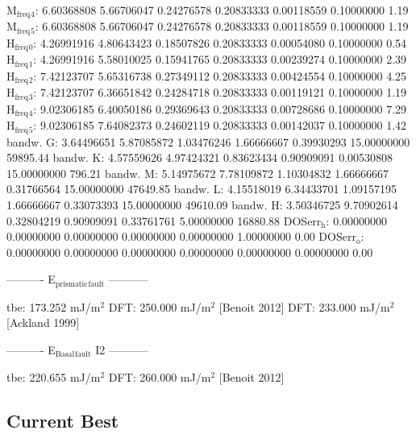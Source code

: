 \documentclass[11pt]{article}
\begin{document}
M\(_{\text{freq}}\)\(_{\text{4}}\):   6.60368808   5.66706047   0.24276578   0.20833333   0.00118559   0.10000000         1.19
M\(_{\text{freq}}\)\(_{\text{5}}\):   6.60368808   5.66706047   0.24276578   0.20833333   0.00118559   0.10000000         1.19
H\(_{\text{freq}}\)\(_{\text{0}}\):   4.26991916   4.80643423   0.18507826   0.20833333   0.00054080   0.10000000         0.54
H\(_{\text{freq}}\)\(_{\text{1}}\):   4.26991916   5.58010025   0.15941765   0.20833333   0.00239274   0.10000000         2.39
H\(_{\text{freq}}\)\(_{\text{2}}\):   7.42123707   5.65316738   0.27349112   0.20833333   0.00424554   0.10000000         4.25
H\(_{\text{freq}}\)\(_{\text{3}}\):   7.42123707   6.36651842   0.24284718   0.20833333   0.00119121   0.10000000         1.19
H\(_{\text{freq}}\)\(_{\text{4}}\):   9.02306185   6.40050186   0.29369643   0.20833333   0.00728686   0.10000000         7.29
H\(_{\text{freq}}\)\(_{\text{5}}\):   9.02306185   7.64082373   0.24602119   0.20833333   0.00142037   0.10000000         1.42
bandw. G:   3.64496651   5.87085872   1.03476246   1.66666667   0.39930293  15.00000000     59895.44
bandw. K:   4.57559626   4.97424321   0.83623434   0.90909091   0.00530808  15.00000000       796.21
bandw. M:   5.14975672   7.78109872   1.10304832   1.66666667   0.31766564  15.00000000     47649.85
bandw. L:   4.15518019   6.34433701   1.09157195   1.66666667   0.33073393  15.00000000     49610.09
bandw. H:   3.50346725   9.70902614   0.32804219   0.90909091   0.33761761   5.00000000     16880.88
DOSerr\(_{\text{h}}\):   0.00000000   0.00000000   0.00000000   0.00000000   0.00000000   1.00000000         0.00
DOSerr\(_{\text{o}}\):   0.00000000   0.00000000   0.00000000   0.00000000   0.00000000   0.00000000         0.00



----------     E\(_{\text{prismatic}}\)\(_{\text{fault}}\)     -----------

tbe:       173.252 mJ/m\(^{\text{2}}\)
DFT:       250.000 mJ/m\(^{\text{2}}\) [Benoit  2012]
DFT:       233.000 mJ/m\(^{\text{2}}\) [Ackland 1999]



----------     E\(_{\text{Basal}}\)\(_{\text{fault}}\) I2     -----------

tbe:       220.655 mJ/m\(^{\text{2}}\)
DFT:       260.000 mJ/m\(^{\text{2}}\) [Benoit  2012]



\subsection{Current Best}
\label{sec:orgcacbee8}
\end{document}
